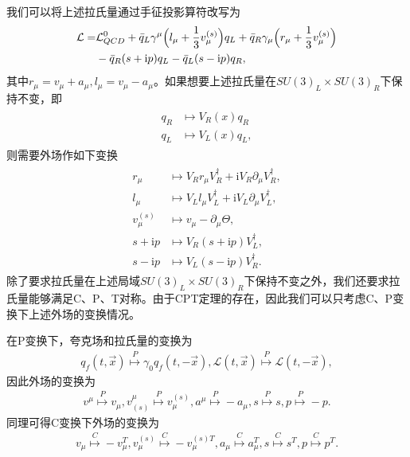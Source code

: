 \documentclass[aps,tightenlines,16pt]{ctexart}
\numberwithin{equation}{section}
\newcommand{\mL}{\mathcal{L}}
\begin{document}
我们可以将上述拉氏量通过手征投影算符改写为
\begin{align}
   \begin{aligned}
   \mL =& \mL_{QCD}^0 + \bar{q}_L\gamma^{\mu}\Bigl(l_{\mu}+\frac{1}{3}v_{\mu}^{(s)}\Bigr)q_L + \bar{q}_R\gamma_{\mu}\Bigl(r_{\mu}+\frac{1}{3}v_{\mu}^{(s)}\Bigr)\\
   & -\bar{q}_R(s+\mbox{i}p)q_L - \bar{q}_L(s-\mbox{i}p)q_R,
   \end{aligned}
\end{align}
其中$r_{\mu}=v_{\mu}+a_{\mu},l_{\mu}=v_{\mu}-a_{\mu}$。如果想要上述拉氏量在$SU(3)_L\times SU(3)_R$下保持不变，即
\begin{align}
   \begin{aligned}
   q_R &\mapsto V_R(x)q_R\\
   q_L &\mapsto V_L(x)q_L,
   \end{aligned}
\end{align}
则需要外场作如下变换
\begin{align}
   \begin{aligned}
   r_{\mu} &\mapsto V_R r_{\mu} V_R^{\dagger} + \mbox{i} V_R \partial_{\mu} V_R^{\dagger},\\
   l_{\mu} &\mapsto V_L l_{\mu} V_L^{\dagger} + \mbox{i} V_L \partial_{\mu} V_L^{\dagger},\\
   v_{\mu}^{(s)} &\mapsto v_{\mu}  - \partial_{\mu} \Theta,\\
   s + \mbox{i}p &\mapsto V_R(s+\mbox{i}p)V_L^{\dagger},\\
   s - \mbox{i}p &\mapsto V_L(s-\mbox{i}p)V_R^{\dagger}.
   \end{aligned}
\end{align}
除了要求拉氏量在上述局域$SU(3)_L\times SU(3)_R$下保持不变之外，我们还要求拉氏量能够满足C、P、T对称。由于CPT定理的存在，因此我们可以只考虑C、P变换下上述外场的变换情况。

在P变换下，夸克场和拉氏量的变换为
\begin{align}
   q_f(t,\vec{x})\stackrel{P}{\mapsto} \gamma_0 q_f(t,-\vec{x}), \mL(t,\vec{x}) \stackrel{P}{\mapsto} \mL(t,-\vec{x}),
\end{align}
因此外场的变换为
\begin{align}
   v^{\mu}\stackrel{P}{\mapsto} v_{\mu},v_{(s)}^{\mu}\stackrel{P}{\mapsto} v^{(s)}_{\mu},a^{\mu}\stackrel{P}{\mapsto} -a_{\mu},s\stackrel{P}{\mapsto} s,p\stackrel{P}{\mapsto}-p.
\end{align}
同理可得C变换下外场的变换为
\begin{align}
   v_{\mu}\stackrel{C}{\mapsto} -v^T_{\mu},v^{(s)}_{\mu}\stackrel{C}{\mapsto} -v^{(s)T}_{\mu},a_{\mu}\stackrel{C}{\mapsto} a^T_{\mu},s\stackrel{C}{\mapsto} s^T,p\stackrel{C}{\mapsto}p^T.
\end{align}
\end{document}
